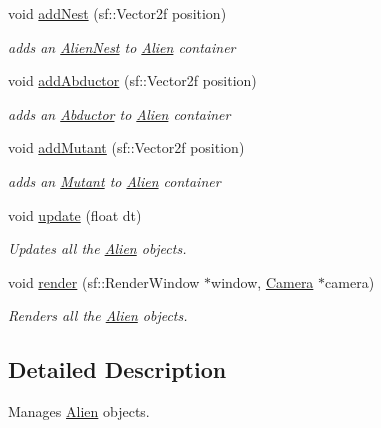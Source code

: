 \begin{DoxyCompactItemize}
\mbox{\label{class_alien_manager_a2a35d52504c40c4e81bdf7212918dbfe}} 
void \hyperlink{class_alien_manager_a2a35d52504c40c4e81bdf7212918dbfe}{add\+Nest} (sf\+::\+Vector2f position)
\begin{DoxyCompactList}\small\item\em adds an \hyperlink{class_alien_nest}{Alien\+Nest} to \hyperlink{class_alien}{Alien} container \end{DoxyCompactList}\item 
\mbox{\label{class_alien_manager_a5887485929cb6cca8ac030297c4748d1}} 
void \hyperlink{class_alien_manager_a5887485929cb6cca8ac030297c4748d1}{add\+Abductor} (sf\+::\+Vector2f position)
\begin{DoxyCompactList}\small\item\em adds an \hyperlink{class_abductor}{Abductor} to \hyperlink{class_alien}{Alien} container \end{DoxyCompactList}\item 
\mbox{\label{class_alien_manager_ab7fb2b7a6977ba318f75d6c66acde43b}} 
void \hyperlink{class_alien_manager_ab7fb2b7a6977ba318f75d6c66acde43b}{add\+Mutant} (sf\+::\+Vector2f position)
\begin{DoxyCompactList}\small\item\em adds an \hyperlink{class_mutant}{Mutant} to \hyperlink{class_alien}{Alien} container \end{DoxyCompactList}\item 
void \hyperlink{class_alien_manager_a1ef71e58d02a0cea52eadccdb2b94ad6}{update} (float dt)
\begin{DoxyCompactList}\small\item\em Updates all the \hyperlink{class_alien}{Alien} objects. \end{DoxyCompactList}\item 
void \hyperlink{class_alien_manager_afe738938dd3967a60ee393d956d5e728}{render} (sf\+::\+Render\+Window $\ast$window, \hyperlink{class_camera}{Camera} $\ast$camera)
\begin{DoxyCompactList}\small\item\em Renders all the \hyperlink{class_alien}{Alien} objects. \end{DoxyCompactList}\end{DoxyCompactItemize}


\subsection{Detailed Description}
Manages \hyperlink{class_alien}{Alien} objects. 


